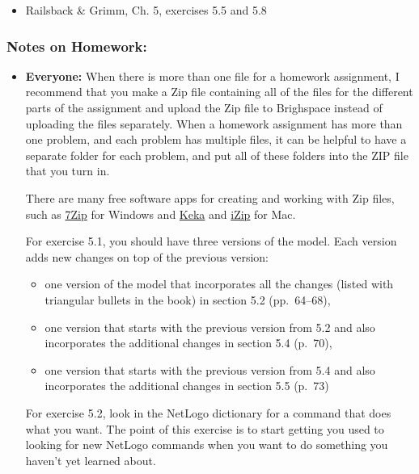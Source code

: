 \documentclass[
]{article}
\providecommand{\tightlist}{%
  \setlength{\itemsep}{0pt}\setlength{\parskip}{0pt}}
\begin{document}
\begin{itemize}
  \begin{itemize}
  \tightlist
  \item
    Railsback \& Grimm, Ch. 5, exercises 5.5 and 5.8
  \end{itemize}
\end{itemize}

\hypertarget{notes-on-homework-2}{%
\subsubsection{Notes on Homework:}\label{notes-on-homework-2}}

\begin{itemize}
\item
  \textbf{Everyone:} When there is more than one file for a homework
  assignment, I recommend that you make a Zip file containing all of the
  files for the different parts of the assignment and upload the Zip
  file to Brighspace instead of uploading the files separately. When a
  homework assignment has more than one problem, and each problem has
  multiple files, it can be helpful to have a separate folder for each
  problem, and put all of these folders into the ZIP file that you turn
  in.

  There are many free software apps for creating and working with Zip
  files, such as \href{https://www.7-zip.org/}{7Zip} for Windows and
  \href{https://www.keka.io/en/}{Keka} and
  \href{https://www.izip.com}{iZip} for Mac.

  For exercise 5.1, you should have three versions of the model. Each
  version adds new changes on top of the previous version:

  \begin{itemize}
  \tightlist
  \item
    one version of the model that incorporates all the changes (listed
    with triangular bullets in the book) in section 5.2 (pp.~64--68),
  \item
    one version that starts with the previous version from 5.2 and also
    incorporates the additional changes in section 5.4 (p.~70),
  \item
    one version that starts with the previous version from 5.4 and also
    incorporates the additional changes in section 5.5 (p.~73)
  \end{itemize}

  For exercise 5.2, look in the NetLogo dictionary for a command that
  does what you want. The point of this exercise is to start getting you
  used to looking for new NetLogo commands when you want to do something
  you haven't yet learned about.


\end{itemize}
\end{document}
